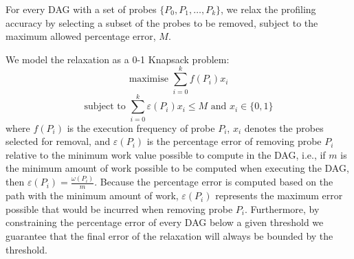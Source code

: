 For every DAG with a set of probes $\{P_0, P_1, \ldots, P_k\}$, we relax the profiling accuracy by selecting a subset of the probes to be removed, subject to the maximum allowed percentage error, $M$.

We model the relaxation as a 0-1 Knapsack problem:
\[
\textrm{maximise } \sum_{i=0}^{k} f(P_i)x_i
\]
\[
\textrm{subject to } \sum_{i=0}^{k} \varepsilon(P_i)x_i \leq M \textrm{ and } x_i\in\{0,1\}
\]
where $f(P_i)$ is the execution frequency of probe $P_i$, $x_i$ denotes the probes selected for removal, and $\varepsilon(P_i)$ is the percentage error of removing probe $P_i$ relative to the minimum work value possible to compute in the DAG, i.e., if $m$ is the minimum amount of work possible to be computed when executing the DAG, then $\varepsilon(P_i) = \frac{\omega(P_i)}{m}$.
Because the percentage error is computed based on the path with the minimum amount of work, $\varepsilon(P_i)$ represents the maximum error possible that would be incurred when removing probe $P_i$.
Furthermore, by constraining the percentage error of every DAG below a given threshold we guarantee that the final error of the relaxation will always be bounded by the threshold.

